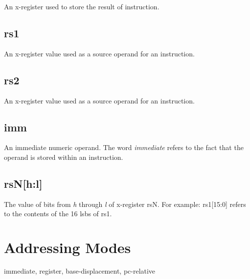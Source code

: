 An x-register used to store the result of instruction.

\subsection{rs1}

An x-register value used as a source operand for an instruction.

\subsection{rs2}

An x-register value used as a source operand for an instruction.

\subsection{imm}

An immediate numeric operand.  The word {\em immediate} refers
to the fact that the operand is stored within an instruction.

\subsection{rsN[h:l]}

The value of bits from {\em h} through {\em l} of x-register rsN.
For example: rs1[15:0] refers to the contents of 
the 16 \acrshort{lsb}s of rs1.


\section{Addressing Modes}

immediate, register, base-displacement, pc-relative


